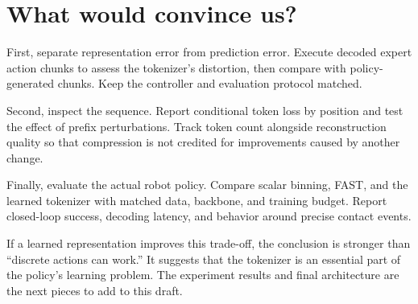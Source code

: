 \section{What would convince us?}

First, separate representation error from prediction error. Execute decoded
expert action chunks to assess the tokenizer’s distortion, then compare with
policy-generated chunks. Keep the controller and evaluation protocol matched.

Second, inspect the sequence. Report conditional token loss by position and test
the effect of prefix perturbations. Track token count alongside reconstruction
quality so that compression is not credited for improvements caused by another
change.

Finally, evaluate the actual robot policy. Compare scalar binning, FAST, and the
learned tokenizer with matched data, backbone, and training budget. Report
closed-loop success, decoding latency, and behavior around precise contact
events.

If a learned representation improves this trade-off, the conclusion is stronger
than “discrete actions can work.” It suggests that the tokenizer is an essential
part of the policy’s learning problem. The experiment results and final
architecture are the next pieces to add to this draft.
